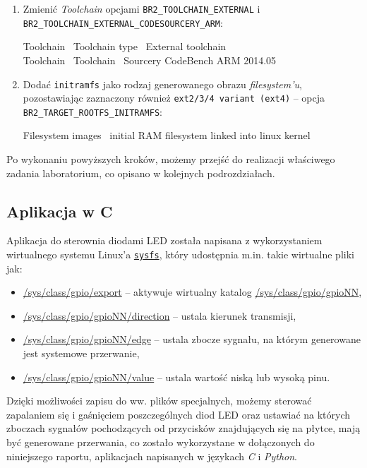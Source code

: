 \documentclass{article}
\newenvironment{ttblock}{\ttfamily}{\par}
\begin{document}
\begin{enumerate}
\item Zmienić \emph{Toolchain} opcjami \texttt{BR2\_TOOLCHAIN\_EXTERNAL} i\\ \texttt{BR2\_TOOLCHAIN\_EXTERNAL\_CODESOURCERY\_ARM}:

\begin{ttblock}
Toolchain \textrightarrow\ Toolchain type \textrightarrow\ External toolchain\\
Toolchain \textrightarrow\ Toolchain \textrightarrow\ Sourcery CodeBench ARM 2014.05
\end{ttblock}

\item Dodać \texttt{initramfs} jako rodzaj generowanego obrazu \emph{filesystem'u}, pozostawiając zaznaczony również \texttt{ext2/3/4 variant (ext4)} -- opcja \\\texttt{BR2\_TARGET\_ROOTFS\_INITRAMFS}:

\begin{ttblock}
Filesystem images \textrightarrow\ initial RAM filesystem linked into linux kernel
\end{ttblock}
\end{enumerate}

Po wykonaniu powyższych kroków, możemy przejść do realizacji właściwego zadania laboratorium, co opisano w kolejnych podrozdziałach.


\subsection{Aplikacja w C}

Aplikacja do sterownia diodami LED została napisana z wykorzystaniem wirtualnego systemu Linux'a \href{https://www.kernel.org/doc/Documentation/filesystems/sysfs.txt}{\texttt{sysfs}}, który udostępnia m.in. takie wirtualne pliki jak:
\begin{itemize}
\item \url{/sys/class/gpio/export} -- aktywuje wirtualny katalog \url{/sys/class/gpio/gpioNN},
\item \url{/sys/class/gpio/gpioNN/direction} -- ustala kierunek transmisji,
\item \url{/sys/class/gpio/gpioNN/edge} -- ustala zbocze sygnału, na którym generowane jest systemowe przerwanie,
\item \url{/sys/class/gpio/gpioNN/value} -- ustala wartość niską lub wysoką pinu.
\end{itemize}
Dzięki możliwości zapisu do ww. plików specjalnych, możemy sterować zapalaniem się i gaśnięciem poszczególnych diod LED oraz ustawiać na których zboczach sygnałów pochodzących od przycisków znajdujących się na płytce, mają być generowane przerwania, co zostało wykorzystane w dołączonych do niniejszego raportu, aplikacjach napisanych w językach \emph{C} i \emph{Python}.
\end{document}
